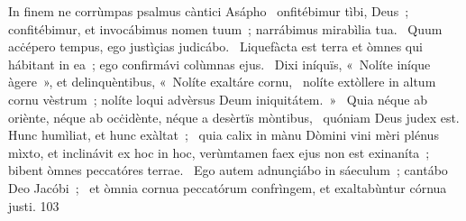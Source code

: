 { In finem ne corrùmpas psalmus càntici Asápho}
{%
~onfitébimur tìbi, Deus~; confitébimur, et invocábimus nomen tuum~; narrábimus mirabìlia tua. 
~Quum acċépero tempus, ego justìçias judicábo. 
~Liquefàcta est terra et òmnes qui hábitant in ea~; ego confirmávi colùmnas ejus. 
~Dixi iníquïs, «~Nolíte iníque àgere~», et delinquèntibus, «~Nolíte exaltáre cornu, 
~nolíte extòllere in altum cornu vèstrum~; nolíte loqui advèrsus Deum iniquitátem.~»
~Quia néque ab oriènte, néque ab ocċidènte, néque a desèrtïs mòntibus, 
~quóniam Deus judex est. Hunc humìliat, et hunc exàltat~; 
~quia calix in mànu Dòmini vini mèri plénus mìxto, et inclinávit ex hoc in hoc, verùmtamen faex ejus non est exinaníta~; bibent òmnes peccatóres terrae. 
~Ego autem adnunçiábo in sáeculum~; cantábo Deo Jacóbi~; 
~et òmnia cornua peccatórum confrìngem, et exaltabùntur córnua justi. 
}
{10}{3}

